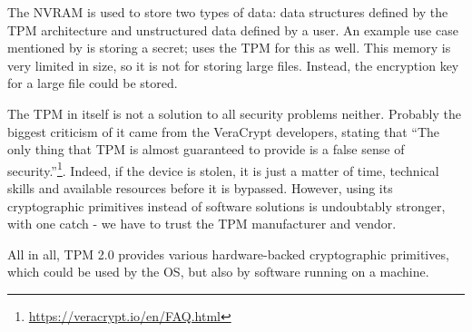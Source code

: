 The NVRAM is used to store two types of data: data structures defined by the TPM architecture and unstructured data defined by a user.
An example use case mentioned by \cite{tpmbook} is storing a secret; \app{} uses the TPM for this as well.
This memory is very limited in size, so it is not for storing large files.
Instead, the encryption key for a large file could be stored.

The TPM in itself is not a solution to all security problems neither.
Probably the biggest criticism of it came from the VeraCrypt developers, stating that ``The only thing that TPM is almost guaranteed to provide is a false sense of security.''\footnote{\url{https://veracrypt.io/en/FAQ.html}}.
Indeed, if the device is stolen, it is just a matter of time, technical skills and available resources before it is bypassed.
However, using its cryptographic primitives instead of software solutions is undoubtably stronger, with one catch - we have to trust the TPM manufacturer and vendor.

All in all, TPM 2.0 provides various hardware-backed cryptographic primitives, which could be used by the OS, but also by software running on a machine.
